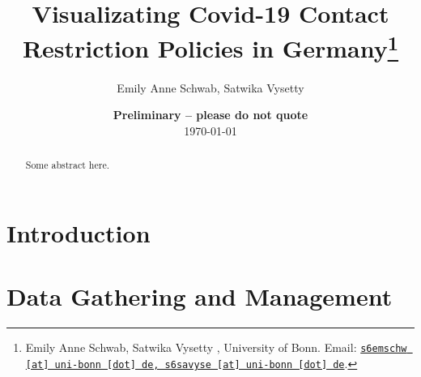 \documentclass[11pt, a4paper, leqno]{article}
\begin{document}
\title{Visualizating Covid-19 Contact Restriction Policies in Germany\thanks{Emily Anne Schwab, Satwika Vysetty , University of Bonn. Email: \href{mailto:s6emschw@uni-bonn.de, s6savyse@uni-bonn.de}{\nolinkurl{s6emschw [at] uni-bonn [dot] de, s6savyse [at] uni-bonn [dot] de}}.}}

\author{Emily Anne Schwab, Satwika Vysetty }

\date{
    {\bf Preliminary -- please do not quote}
    \\[1ex]
    \today
}

\maketitle


\begin{abstract}
    Some abstract here.
\end{abstract}
\clearpage

\section*{Introduction} %
\label{sec:introduction}













\section{Data Gathering and Management} %
\label{sec:section1}
\end{document}
